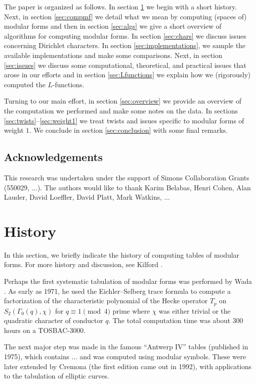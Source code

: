 \documentclass[11pt]{amsart}
\numberwithin{equation}{subsection}
\theoremstyle{plain}
\theoremstyle{definition}
\begin{document}
The paper is organized as follows.  In section \ref{sec:history} we begin with a short history.  Next, in section \ref{sec:compmf} we detail what we mean by computing (spaces of) modular forms and then in section \ref{sec:algs} we give a short overview of algorithms for computing modular forms.  In section \ref{sec:chars} we discuss issues concerning Dirichlet characters.  In section \ref{sec:implementations}, we sample the available implementations and make some comparisons.  Next, in section \ref{sec:issues} we discuss some computational, theoretical, and practical issues that arose in our efforts and in section \ref{sec:Lfunctions} we explain how we (rigorously) computed the $L$-functions.  

Turning to our main effort, in section \ref{sec:overview} we provide an overview of the computation we performed and make some notes on the data.  In sections \ref{sec:twists}--\ref{sec:weight1} we treat twists and issues specific to modular forms of weight $1$.  We conclude in section \ref{sec:conclusion} with some final remarks.  

\subsection{Acknowledgements}

This research was undertaken under the support of Simons Collaboration Grants (550029, ...).  The authors would like to thank Karim Belabas, Henri Cohen, Alan Lauder, David Loeffler, David Platt, Mark Watkins, ...


\section{History} \label{sec:history}

In this section, we briefly indicate the history of computing tables of modular forms.  For more history and discussion, see Kilford \cite[Chapter 7]{Kilford}.

Perhaps the first systematic tabulation of modular forms was performed by Wada \cite{Wada1,Wada2}.  As early as 1971, he used the Eichler--Selberg trace formula to compute a factorization of the characteristic polynomial of the Hecke operator $T_p$ on $S_2(\Gamma_0(q),\chi)$ for $q \equiv 1 \pmod{4}$ prime where $\chi$ was either trivial or the quadratic character of conductor $q$.  The total computation time was about 300 hours on a TOSBAC-3000.  

The next major step was made in the famous ``Antwerp IV'' tables (published in 1975), which contains ...  and was computed using modular symbols.  These were later extended by Cremona \cite{Cremona:mec} (the first edition came out in 1992), with applications to the tabulation of elliptic curves.
\end{document}
